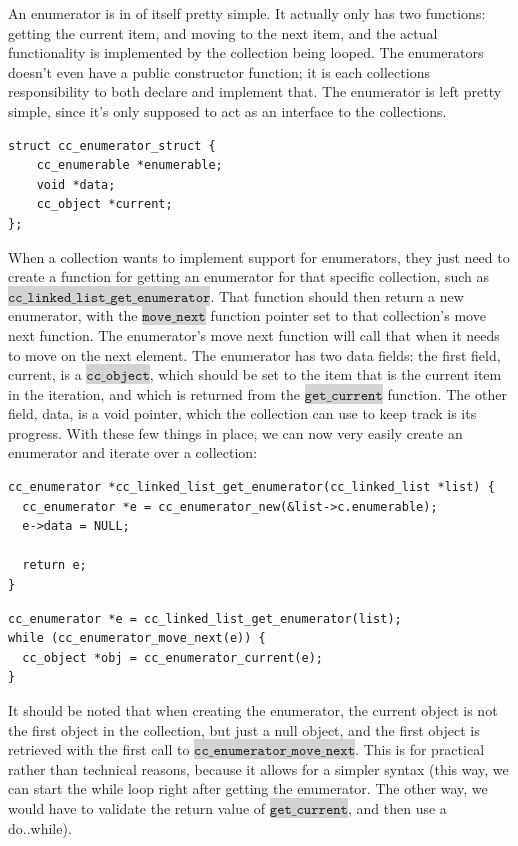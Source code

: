 \documentclass[table]{ituthesis}
\newcommand{\highlight}[1]{\colorbox{lightGray}{$\displaystyle \texttt{#1}$}}
\begin{document}
	An enumerator is in of itself pretty simple. It actually only has two functions: getting the current item, and moving to the next item, and the actual functionality is implemented by the collection being looped. The enumerators doesn't even have a public constructor function; it is each collections responsibility to both declare and implement that. The enumerator is left pretty simple, since it's only supposed to act as an interface to the collections.

\begin{lstlisting}[label=cc_enumerator-struct,caption=The enumerator struct]
struct cc_enumerator_struct {
	cc_enumerable *enumerable;
	void *data;
	cc_object *current;
};
\end{lstlisting}

	When a collection wants to implement support for enumerators, they just need to create a function for getting an enumerator for that specific collection, such as \highlight{cc\_linked\_list\_get\_enumerator}. That function should then return a new enumerator, with the \highlight{move\_next} function pointer set to that collection's move next function. The enumerator's move next function will call that when it needs to move on the next element. The enumerator has two data fields: the first field, current, is a \highlight{cc\_object}, which should be set to the item that is the current item in the iteration, and which is returned from the \highlight{get\_current} function. The other field, data, is a void pointer, which the collection can use to keep track is its progress. With these few things in place, we can now very easily create an enumerator and iterate over a collection:

\begin{lstlisting}[label=cc_enumerator-impl-example,caption=Implementation of linked list's get_enumerator]	
cc_enumerator *cc_linked_list_get_enumerator(cc_linked_list *list) {
  cc_enumerator *e = cc_enumerator_new(&list->c.enumerable);
  e->data = NULL;

  return e;
}
\end{lstlisting}

\begin{lstlisting}[label=cc_enumerator-example,caption=Using enumerators in CCollections]
cc_enumerator *e = cc_linked_list_get_enumerator(list);
while (cc_enumerator_move_next(e)) {
  cc_object *obj = cc_enumerator_current(e);
}
\end{lstlisting}

	It should be noted that when creating the enumerator, the current object is not the first object in the collection, but just a null object, and the first object is retrieved with the first call to \highlight{cc\_enumerator\_move\_next}. This is for practical rather than technical reasons, because it allows for a simpler syntax (this way, we can start the while loop right after getting the enumerator. The other way, we would have to validate the return value of \highlight{get\_current}, and then use a do..while).
\end{document}
